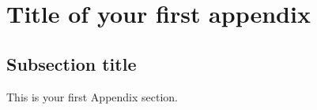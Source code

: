 \chapter{Title of your first appendix}

\section{Subsection title} \label{app-a}

This is your first Appendix section.

%